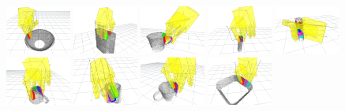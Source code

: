 \begin{figure}
\includegraphics[width=0.19\textwidth]{images/contact-viewall1}
\includegraphics[width=0.19\textwidth]{images/contact-viewall2}
\includegraphics[width=0.19\textwidth]{images/contact-viewall3}
\includegraphics[width=0.19\textwidth]{images/contact-viewall4}
\includegraphics[width=0.19\textwidth]{images/contact-viewall5}\\
\includegraphics[width=0.19\textwidth]{images/contact-viewall6}
\includegraphics[width=0.19\textwidth]{images/contact-viewall7}
\includegraphics[width=0.19\textwidth]{images/contact-viewall8}
\includegraphics[width=0.19\textwidth]{images/contact-viewall9}

\end{figure}

